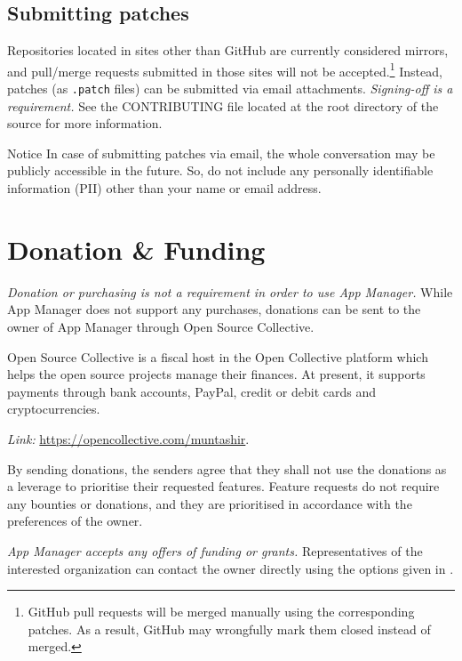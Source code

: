 \subsection{Submitting patches}\label{subsec:submitting-patches} %
Repositories located in sites other than GitHub are currently considered mirrors, and pull/merge requests submitted in
those sites will not be accepted.\footnote{GitHub pull requests will be merged manually using the corresponding patches.
As a result, GitHub may wrongfully mark them closed instead of merged.} Instead, patches (as \texttt{.patch} files) can
be submitted via email attachments. \textit{Signing-off is a requirement.} See the CONTRIBUTING file located at the root
directory of the source for more information.

\begin{warning}{Notice}
    In case of submitting patches via email, the whole conversation may be publicly accessible in the future. So, do not
    include any personally identifiable information (PII) other than your name or email address.
\end{warning}


\section{Donation \& Funding}\label{sec:donation-&-funding} %
\emph{Donation or purchasing is not a requirement in order to use App Manager.} While App Manager does not support any
purchases, donations can be sent to the owner of App Manager through Open Source Collective.

Open Source Collective is a fiscal host in the Open Collective platform which helps the open source projects manage
their finances. At present, it supports payments through bank accounts, PayPal, credit or debit cards and
cryptocurrencies.

\textit{Link:} \url{https://opencollective.com/muntashir}.

By sending donations, the senders agree that they shall not use the donations as a leverage to prioritise their
requested features. Feature requests do not require any bounties or donations, and they are prioritised in accordance
with the preferences of the owner.

\emph{App Manager accepts any offers of funding or grants.} Representatives of the interested organization can contact
the owner directly using the options given in .


